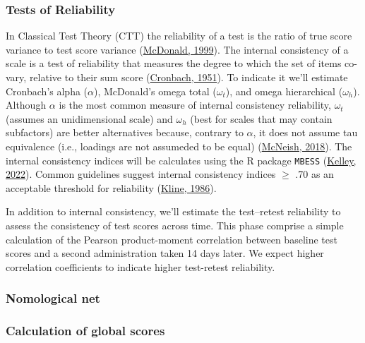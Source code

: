 \documentclass[
  ,doc,11pt, twoside,floatsintext]{apa6}
\begin{document}
\hypertarget{tests-of-reliability}{%
\subsubsection{Tests of Reliability}\label{tests-of-reliability}}

In Classical Test Theory (CTT) the reliability of a test is the ratio of true score variance to test score variance (\protect\hyperlink{ref-mcdonald1999}{McDonald, 1999}). The internal consistency of a scale is a test of reliability that measures the degree to which the set of items co-vary, relative to their sum score (\protect\hyperlink{ref-cronbach1951}{Cronbach, 1951}). To indicate it we'll estimate Cronbach's alpha (\(\alpha\)), McDonald's omega total (\(\omega_t\)), and omega hierarchical (\(\omega_h\)). Although \(\alpha\) is the most common measure of internal consistency reliability, \(\omega_t\) (assumes an unidimensional scale) and \(\omega_h\) (best for scales that may contain subfactors) are better alternatives because, contrary to \(\alpha\), it does not assume tau equivalence (i.e., loadings are not assumeded to be equal) (\protect\hyperlink{ref-mcneish2018}{McNeish, 2018}). The internal consistency indices will be calculates using the R package \texttt{MBESS} (\protect\hyperlink{ref-MBESS}{Kelley, 2022}). Common guidelines suggest internal consistency indices \(\ge\) .70 as an acceptable threshold for reliability (\protect\hyperlink{ref-kline1986}{Kline, 1986}).

In addition to internal consistency, we'll estimate the test--retest reliability to assess the consistency of test scores across time. This phase comprise a simple calculation of the Pearson product-moment correlation between baseline test scores and a second administration taken 14 days later. We expect higher correlation coefficients to indicate higher test-retest reliability.

\hypertarget{nomological-net}{%
\subsubsection{Nomological net}\label{nomological-net}}

\hypertarget{calculation-of-global-scores}{%
\subsubsection{Calculation of global scores}\label{calculation-of-global-scores}}

\newpage
\end{document}

